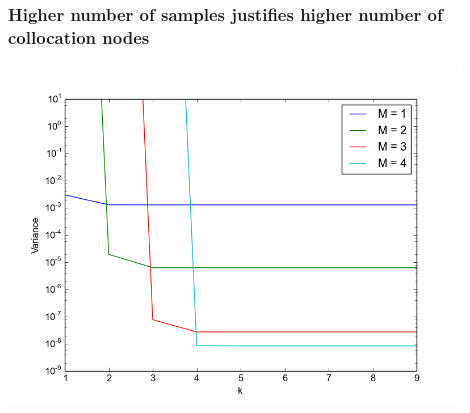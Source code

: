 \documentclass{beamer}
\begin{document}
\begin{frame}
 \frametitle{Higher number of samples justifies higher number of
 collocation nodes}
\includegraphics[width=0.9\textwidth]{k_convergence.png}
 \end{frame}


  
\end{document}
